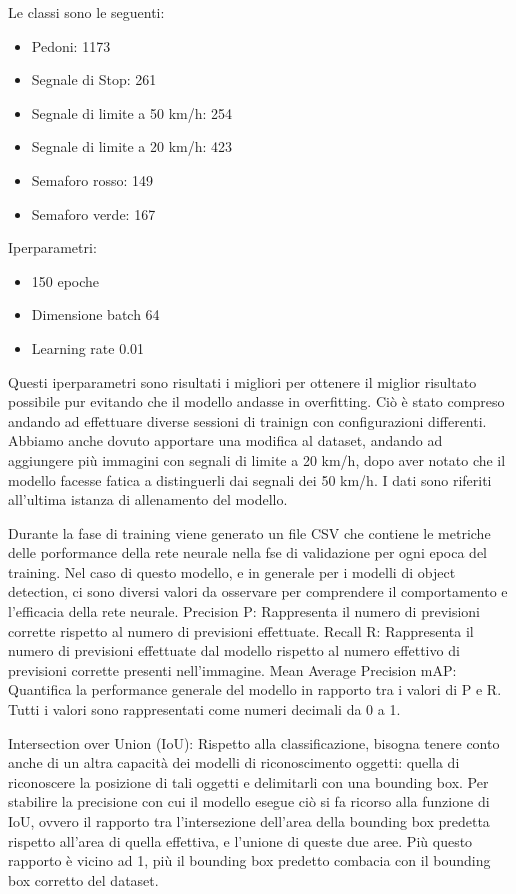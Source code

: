 \documentclass{article}
\begin{document}
  Le classi sono le seguenti:
  \begin{itemize}
    \item Pedoni: 1173
    \item Segnale di Stop: 261
    \item Segnale di limite a 50 km/h: 254
    \item Segnale di limite a 20 km/h: 423
    \item Semaforo rosso: 149
    \item Semaforo verde: 167
  \end{itemize}
  
  Iperparametri:
  \begin{itemize}
    \item 150 epoche
    \item Dimensione batch 64
    \item Learning rate 0.01
  \end{itemize}

  Questi iperparametri sono risultati i migliori per ottenere il miglior risultato possibile pur evitando che il modello andasse in overfitting. Ciò è stato compreso andando ad effettuare diverse sessioni di trainign con configurazioni differenti.
  Abbiamo anche dovuto apportare una modifica al dataset, andando ad aggiungere più immagini con segnali di limite a 20 km/h, dopo aver notato che il modello facesse fatica a distinguerli dai segnali dei 50 km/h.
  I dati sono riferiti all'ultima istanza di allenamento del modello.

  Durante la fase di training viene generato un file CSV che contiene le metriche delle porformance della rete neurale nella fse di validazione per ogni epoca del training.
  Nel caso di questo modello, e in generale per i modelli di object detection, ci sono diversi valori da osservare per comprendere il comportamento e l'efficacia della rete neurale.
  Precision P: Rappresenta il numero di previsioni corrette rispetto al numero di previsioni effettuate.
  Recall R: Rappresenta il numero di previsioni effettuate dal modello rispetto al numero effettivo di previsioni corrette presenti nell'immagine.
  Mean Average Precision mAP: Quantifica la performance generale del modello in rapporto tra i valori di P e R.
  Tutti i valori sono rappresentati come numeri decimali da 0 a 1.

  Intersection over Union (IoU): Rispetto alla classificazione, bisogna tenere conto anche di un altra capacità dei modelli di riconoscimento oggetti: quella di riconoscere la posizione di tali oggetti e delimitarli con una bounding box.
  Per stabilire la precisione con cui il modello esegue ciò si fa ricorso alla funzione di IoU, ovvero il rapporto tra l'intersezione dell'area della bounding box predetta rispetto all'area di quella effettiva, e l'unione di queste due aree.
  Più questo rapporto è vicino ad 1, più il bounding box predetto combacia con il bounding box corretto del dataset.
  
\end{document}
